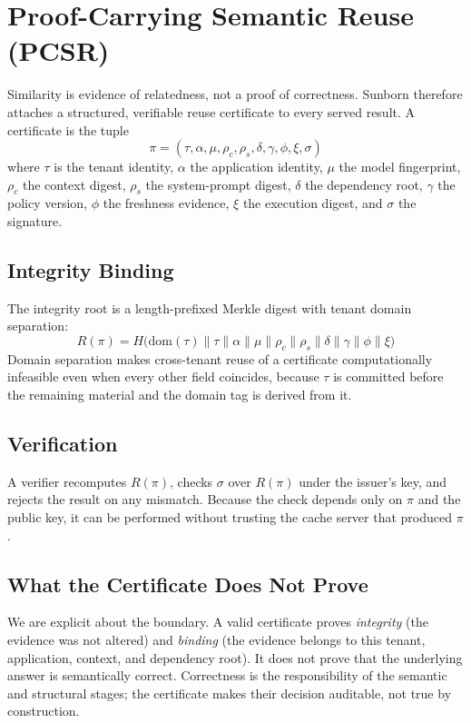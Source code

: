 \documentclass[conference]{IEEEtran}
\begin{document}
\section{Proof-Carrying Semantic Reuse (PCSR)}
Similarity is evidence of relatedness, not a proof of correctness. Sunborn therefore attaches a structured, verifiable reuse certificate to every served result. A certificate is the tuple
\begin{equation}
\pi = (\tau, \alpha, \mu, \rho_c, \rho_s, \delta, \gamma, \phi, \xi, \sigma)
\end{equation}
where $\tau$ is the tenant identity, $\alpha$ the application identity, $\mu$ the model fingerprint, $\rho_c$ the context digest, $\rho_s$ the system-prompt digest, $\delta$ the dependency root, $\gamma$ the policy version, $\phi$ the freshness evidence, $\xi$ the execution digest, and $\sigma$ the signature.

\subsection{Integrity Binding}
The integrity root is a length-prefixed Merkle digest with tenant domain separation:
\begin{equation}
R(\pi) = H\big(\text{dom}(\tau) \parallel \tau \parallel \alpha \parallel \mu \parallel \rho_c \parallel \rho_s \parallel \delta \parallel \gamma \parallel \phi \parallel \xi\big)
\end{equation}
Domain separation makes cross-tenant reuse of a certificate computationally infeasible even when every other field coincides, because $\tau$ is committed before the remaining material and the domain tag is derived from it.

\subsection{Verification}
A verifier recomputes $R(\pi)$, checks $\sigma$ over $R(\pi)$ under the issuer's key, and rejects the result on any mismatch. Because the check depends only on $\pi$ and the public key, it can be performed without trusting the cache server that produced $\pi$.

\subsection{What the Certificate Does Not Prove}
We are explicit about the boundary. A valid certificate proves \emph{integrity} (the evidence was not altered) and \emph{binding} (the evidence belongs to this tenant, application, context, and dependency root). It does not prove that the underlying answer is semantically correct. Correctness is the responsibility of the semantic and structural stages; the certificate makes their decision auditable, not true by construction.
\end{document}
